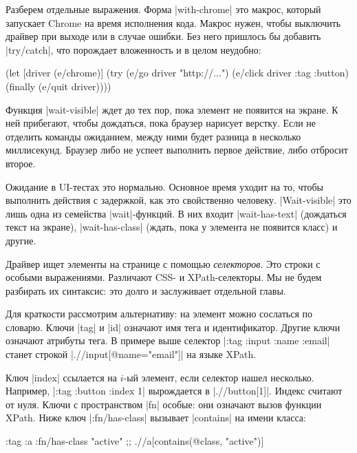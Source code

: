 Разберем отдельные выражения. Форма \spverb|with-chrome| это макрос, который
запускает Chrome на время исполнения кода. Макрос нужен, чтобы выключить драйвер
при выходе или в случае ошибки. Без него пришлось бы добавить
\spverb|try/catch|, что порождает вложенность и в целом неудобно:

\begin{english}
  \begin{clojure}
(let [driver (e/chrome)]
  (try
    (e/go driver "http://...")
    (e/click driver {:tag :button})
    (finally
      (e/quit driver))))
  \end{clojure}
\end{english}

Функция \spverb|wait-visible| ждет до тех пор, пока элемент не появится на
экране. К ней прибегают, чтобы дождаться, пока браузер нарисует верстку. Если не
отделить команды ожиданием, между ними будет разница в несколько
миллисекунд. Браузер либо не успеет выполнить первое действие, либо отбросит
второе.

Ожидание в UI-тестах это нормально. Основное время уходит на то, чтобы выполнить
действия с задержкой, как это свойственно человеку. \spverb|Wait-visible| это
лишь одна из семейства \spverb|wait|-функций. В них входит
\spverb|wait-has-text| (дождаться текст на экране), \spverb|wait-has-class|
(ждать, пока у элемента не появится класс) и другие.

Драйвер ищет элементы на странице с помощью \emph{селекторов}. Это строки с
особыми выражениями. Различают CSS-
и XPath-селекторы. Мы не будем разбирать их
синтаксис: это долго и заслуживает отдельной главы.

Для краткости рассмотрим альтернативу: на элемент можно сослаться по
словарю. Ключи \spverb|tag| и \spverb|id| означают имя тега и
идентификатор. Другие ключи означают атрибуты тега. В примере выше селектор
\spverb|{:tag :input :name :email}| станет строкой
\spverb|.//input[@name="email"]| на языке XPath.

Ключ \spverb|index| ссылается на $i$-ый элемент, если селектор нашел
несколько. Например, \spverb|{:tag :button :index 1}| вырождается в
\spverb|.//button[1]|. Индекс считают от нуля. Ключи с пространством \spverb|fn|
особые: они означают вызов функции XPath. Ниже ключ \spverb|:fn/has-class|
вызывает \spverb|contains| на имени класса:

\begin{english}
  \begin{clojure}
{:tag :a :fn/has-class "active"}
;; .//a[contains(@class, "active")]
  \end{clojure}
\end{english}

